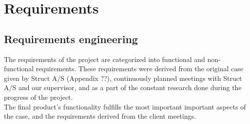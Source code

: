 
\chapter{Requirements} %

\label{Chapter3} %


\section{Requirements engineering}
The requirements of the project are categorized into functional and non-functional requirements. These requirements were derived from the original case given by Struct A/S (Appendix ??), continuously planned meetings with Struct A/S and our supervisor, and as a part of the constant research done during the progress of the project. \\
The final product's functionality fulfills the most important important aspects of the case, and the requirements derived from the client meetings.


